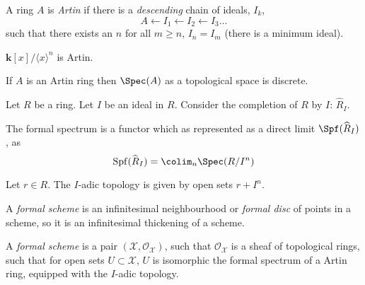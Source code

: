     
    \begin{defn}
        A ring \(A\) is \emph{Artin} if there is a \emph{descending} chain of ideals, \(I_k\),
        \[ A \leftarrow I_1 \leftarrow I_2 \leftarrow I_3 \dots \]
        such that there exists an \(n\) for all \(m \geq n\), \(I_n = I_m\) (there is a minimum ideal).
    \end{defn} 
    
    \begin{ex}
    \(\mathbf{k}[x]/\langle x\rangle^n \) is Artin.
    \end{ex}

    
    \begin{ex} If \( A\) is an Artin ring then \(\Spec(A)\) as a topological space is discrete.
    \end{ex} 
    
    
    Let \(R\) be a ring. Let \(I\) be an ideal in \(R\). Consider the completion of \(R\) by \(I\): \(\widehat{R\hspace{0pt}}_I\).
    
    \begin{defn}
    The formal spectrum is a functor which as represented as a direct limit \( \Spf(\widehat{R\hspace{0pt}}_I)\), as 
    \[ \mathrm{Spf}(\widehat{R\hspace{0pt}}_I) = \colim_n \Spec(R/I^n)\]
    \end{defn}
    
    \begin{defn}
    Let \(r \in R\). The \(I\)-adic topology is given by open sets \( r + I^n\).
    \end{defn}
    
    A \emph{formal scheme} is an infinitesimal neighbourhood or \emph{formal disc} of points in a scheme, so it is an infinitesimal thickening of a scheme.
    

    \begin{defn}
    A \emph{formal scheme} is a pair \(( \mathcal{X} , \mathcal{O}_\mathcal{X} )\), such that \( \mathcal{O}_\mathcal{X}\) is a sheaf of topological rings, such that for open sets \(U \subset \mathcal{X}\), \(U\) is isomorphic the formal spectrum of a Artin ring, equipped with the \(I\)-adic topology.
    \end{defn}
    
